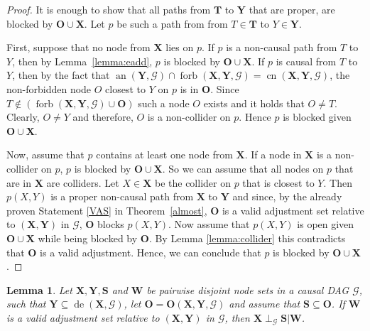 \documentclass[11pt,a4paper]{article}
\newtheorem{Lemma}[Satz]{Lemma}
\theoremstyle{definition}
\theoremstyle{remark}
\DeclareMathOperator{\Forbb}{forb}
\DeclareMathOperator{\de}{de}
\DeclareMathOperator{\an}{an}
\DeclareMathOperator{\CN}{cn}
\newcommand{\g}[1][G]{\mathcal{#1}}
\newcommand{\fb}[2][X,Y]{\Forbb(\mathbf{#1},#2)}
\newcommand{\cnb}[2][X,Y]{\CN(\mathbf{#1},#2)}
\newcommand{\optb}[2][X,Y]{\mathbf{O}(\mathbf{#1},#2)}
\begin{document}
\begin{proof}%
	It is enough to show that all paths from $\mathbf{T}$ to $\mathbf{Y}$ that are proper, are blocked by $\mathbf{O} \cup \mathbf{X}$. Let $p$ be such a path from from $T \in \mathbf{T}$ to $Y \in \mathbf{Y}$. %
	
	First, suppose that no node from $\mathbf{X}$ lies on $p$. If $p$ is a non-causal path from $T$ to $Y$, then by Lemma~\ref{lemma:eadd}, $p$ is blocked by  $\mathbf{O} \cup \mathbf{X}$. If $p$ is causal from $T$ to $Y$,  then by the fact that $\an(\mathbf{Y},\g) \cap \fb{\g} = \cnb{\g}$, the non-forbidden node $O$ closest to $Y$ on $p$ is in $\mathbf{O}$. Since $T \notin (\fb{\g} \cup \mathbf{O})$ such a node $O$ exists and it holds that $O \neq T$. Clearly, $O \neq Y$ and therefore, $O$ is a non-collider on $p$. Hence $p$ is blocked given $\mathbf{O} \cup \mathbf{X}$.
	
	Now, assume that $p$ contains at least one node from $\mathbf{X}$. If a node in $\mathbf{X}$ is a non-collider on $p$, $p$ is blocked by $\mathbf{O} \cup \mathbf{X}$. So we can assume that all nodes on $p$ that are in $\mathbf{X}$ are colliders. Let $X \in \mathbf{X}$ be the collider on $p$ that is closest to $Y$. Then $p(X,Y)$ is a proper non-causal
	path from $\mathbf{X}$ to $\mathbf{Y}$ and since, by the already proven Statement \ref{VAS} in Theorem~\ref{almost}, $\mathbf{O}$ is a valid adjustment set relative to 
	$(\mathbf{X,Y})$ in $\g$, $\mathbf{O}$ blocks $p(X,Y)$. Now assume that $p(X,Y)$ is open given $\mathbf{O} \cup \mathbf{X}$ while being blocked by $\mathbf{O}$. By Lemma \ref{lemma:collider} this contradicts that $\mathbf{O}$ is a valid adjustment. Hence, we can conclude that $p$ is blocked by $\mathbf{O} \cup \mathbf{X}$.
	
\end{proof}


\begin{Lemma}
	Let $\mathbf{X},\mathbf{Y},\mathbf{S}$ and $\mathbf{W}$ be pairwise disjoint node sets in a causal DAG $\g$, such that $\mathbf{Y} \subseteq \de(\mathbf{X},\g)$, let $\mathbf{O}=\optb{\g}$ and assume that $\mathbf{S}  \subseteq \mathbf{O}$. If $\mathbf{W}$ is a valid adjustment set relative to $(\mathbf{X},\mathbf{Y})$ in $\g$, then $\mathbf{X} \perp_{\g} \mathbf{S}| \mathbf{W}$. 
	\label{x-separation}
\end{Lemma}
\end{document}
